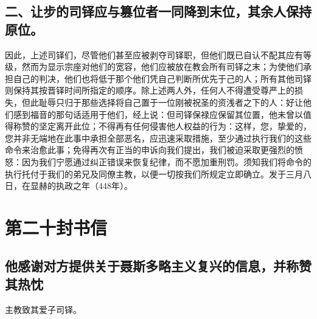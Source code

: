 
\subsection{二、让步的司铎应与篡位者一同降到末位，其余人保持原位。}

因此，上述司铎们，尽管他们甚至应被剥夺司铎职，但他们既已自认不配其应有等级，然而为显示宗座对他们的宽容，他们应被放在教会所有司铎之末；为使他们承担自己的判决，他们也将低于那个他们凭自己判断所优先于己的人；所有其他司铎则保持其按晋铎时间所指定的顺序。除上述两人外，任何人不得遭受尊严上的损失，但此耻辱只归于那些选择将自己置于一位刚被祝圣的资浅者之下的人：好让他们感到福音的那句话适用于他们，经上说：但司铎保禄应保留其位置，他未曾以值得称赞的坚定离开此位；不得再有任何侵害他人权益的行为：这样，您，挚爱的，您并非无端地在此事中承担全部恶名，应迅速采取措施，至少通过执行我们的这些命令来治愈此事；免得再次有正当的申诉向我们提出，我们被迫采取更强烈的愤怒：因为我们宁愿通过纠正错误来恢复纪律，而不愿加重刑罚。须知我们将命令的执行托付于我们的弟兄及同僚主教，以便一切按我们所规定立即确立。发于三月八日，在显赫的执政之年（448年）。\par



\section{第二十封书信}


\subsection{他感谢对方提供关于聂斯多略主义复兴的信息，并称赞其热忱}

主教致其爱子司铎。\par

